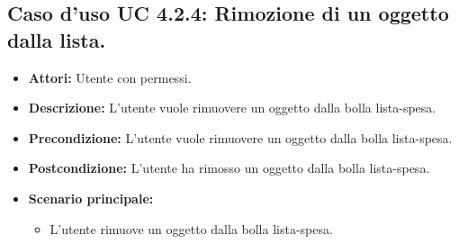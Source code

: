 \subsection{Caso d'uso UC 4.2.4: Rimozione di un oggetto dalla lista.}
\label{Caso d'uso UC 4.2.4: Rimozione di un oggetto dalla lista.}

\FloatBarrier
\begin{itemize}
\item \textbf{Attori:} Utente con permessi.
\item \textbf{Descrizione:} L'utente vuole rimuovere un oggetto dalla bolla lista-spesa.
\item \textbf{Precondizione:} L'utente vuole rimuovere un oggetto dalla bolla lista-spesa. 
\item \textbf{Postcondizione:} L'utente ha rimosso un oggetto dalla bolla lista-spesa.
\item \textbf{Scenario principale:}
	\begin{itemize}
	\item{L'utente rimuove un oggetto dalla bolla lista-spesa.}
	\end{itemize}
\end{itemize}